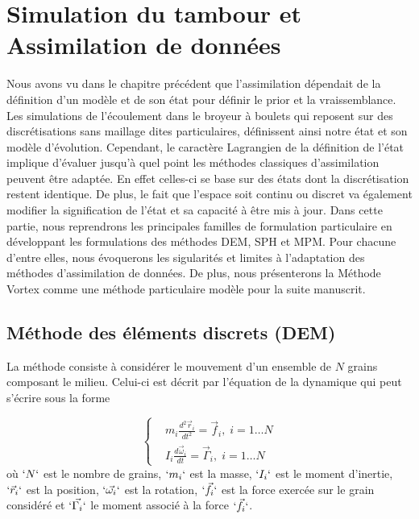 
\chapter{Simulation du tambour et Assimilation de données}

Nous avons vu dans le chapitre précédent que l'assimilation dépendait de la définition d'un modèle et de son état pour définir le prior et la vraissemblance. Les simulations de l'écoulement dans le broyeur à boulets qui reposent sur des discrétisations sans maillage dites particulaires, définissent ainsi notre état et son modèle d'évolution. Cependant, le caractère Lagrangien de la définition de l'état implique d'évaluer jusqu'à quel point les méthodes classiques d'assimilation peuvent être adaptée. En effet celles-ci se base sur des états dont la discrétisation restent identique. De plus, le fait que l'espace soit continu ou discret va également modifier la signification de l'état et sa capacité à être mis à jour.
Dans cette partie, nous reprendrons les principales familles de formulation particulaire en développant les formulations des méthodes DEM, SPH et MPM.  Pour chacune d'entre elles, nous évoquerons les sigularités et limites à l'adaptation des méthodes d'assimilation de données. De plus, nous présenterons la Méthode Vortex comme une méthode particulaire modèle pour la suite manuscrit.


\section{Méthode des éléments discrets (DEM)}

La méthode consiste à considérer le mouvement d'un ensemble de $N$ grains composant le milieu. Celui-ci est décrit par l'équation de la dynamique qui peut s'écrire sous la forme

\begin{equation*}
    \left\{
    \begin{aligned}
         & m_{i} \frac{ d^{2}\vec{r}_i }{dt^2}=\vec{f}_{i},\; i=1\ldots N      \\
         & I_{i} \frac{d \vec{\omega}_{i}}{dt}=\vec{\Gamma}_{i},\; i=1\ldots N
    \end{aligned}
    \right.
\end{equation*}où $`N`$ est le nombre de grains, $`m_{i}`$ est la masse, $`I_i`$ est le moment d'inertie, $`\vec{r}_{i}`$ est la position, $`\vec{\omega_{i}}`$ est la rotation, $`\vec{f}_{i}`$ est la force exercée sur le grain considéré et $`\vec{\Gamma_{i}}`$ le moment associé à la force $`\vec{f}_{i}`$.

